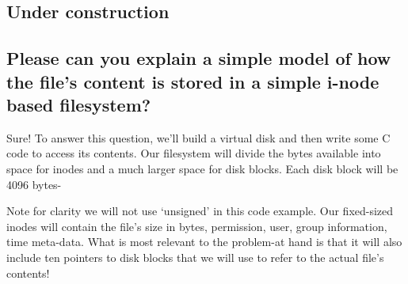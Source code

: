 \subsection{Under construction}\label{under-construction}

\subsection{Please can you explain a simple model of how the file's
content is stored in a simple i-node based
filesystem?}\label{please-can-you-explain-a-simple-model-of-how-the-files-content-is-stored-in-a-simple-i-node-based-filesystem}

Sure! To answer this question, we'll build a virtual disk and then write
some C code to access its contents. Our filesystem will divide the bytes
available into space for inodes and a much larger space for disk blocks.
Each disk block will be 4096 bytes-

\begin{Shaded}
\begin{Highlighting}[]

 \NormalTok{[}\NormalTok{] block_t;}

 
\end{Highlighting}
\end{Shaded}

Note for clarity we will not use `unsigned' in this code example. Our
fixed-sized inodes will contain the file's size in bytes, permission,
user, group information, time meta-data. What is most relevant to the
problem-at hand is that it will also include ten pointers to disk blocks
that we will use to refer to the actual file's contents!

\begin{Shaded}
\begin{Highlighting}[]
 
 \NormalTok{[}\NormalTok{] directblocks; }
  
  
\NormalTok{\}}
\end{Highlighting}
\end{Shaded}

